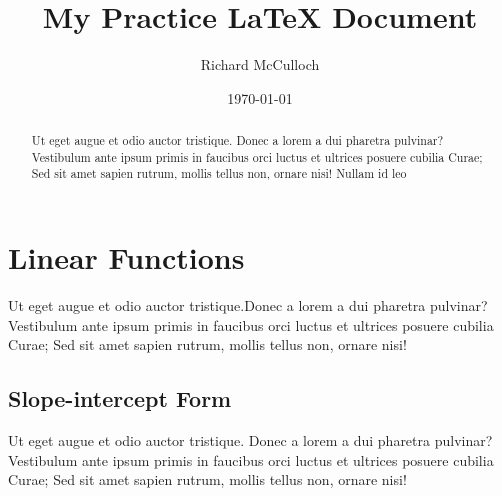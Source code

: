 \documentclass[12pt]{article}
\begin{document}
\title{My Practice \LaTeX{} Document}
\author{Richard McCulloch} %
\date{\today}
\maketitle

\newpage

\tableofcontents

\newpage


\begin{abstract}
Ut eget augue et odio auctor tristique. Donec a lorem a dui pharetra pulvinar?
Vestibulum ante ipsum primis in faucibus orci luctus et ultrices posuere cubilia
Curae; Sed sit amet sapien rutrum, mollis tellus non, ornare nisi! Nullam id leo
\end{abstract}

\section{Linear Functions}
Ut eget augue et odio auctor tristique.Donec a lorem a dui pharetra pulvinar?
Vestibulum ante ipsum primis in faucibus orci luctus et ultrices posuere cubilia
Curae; Sed sit amet sapien rutrum, mollis tellus non, ornare nisi!
  \subsection{Slope-intercept Form}
  Ut eget augue et odio auctor tristique.  Donec a lorem a dui pharetra
  pulvinar?  Vestibulum ante ipsum primis in faucibus orci luctus et ultrices
  posuere cubilia Curae; Sed sit amet sapien rutrum, mollis tellus non, ornare
  nisi!
\end{document}
